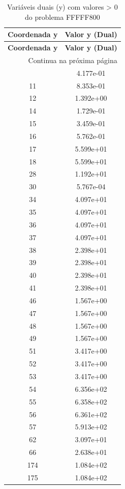 \documentclass[12pt]{article}
\begin{document}
\begin{longtable}{@{}cc@{}}
\caption{Variáveis duais (y) com valores > 0 do problema FFFFF800} \\
\toprule
\textbf{Coordenada y} & \textbf{Valor y (Dual)} \\
\midrule
\endfirsthead

\toprule
\textbf{Coordenada y} & \textbf{Valor y (Dual)} \\
\midrule
\endhead

\midrule \multicolumn{2}{r}{{Continua na próxima página}} \\ \midrule
\endfoot

\bottomrule
\endlastfoot
10 & 4.177e-01 \\
11 & 8.353e-01 \\
12 & 1.392e+00 \\
14 & 1.729e-01 \\
15 & 3.459e-01 \\
16 & 5.762e-01 \\
17 & 5.599e+01 \\
18 & 5.599e+01 \\
28 & 1.192e+01 \\
30 & 5.767e-04 \\
34 & 4.097e+01 \\
35 & 4.097e+01 \\
36 & 4.097e+01 \\
37 & 4.097e+01 \\
38 & 2.398e+01 \\
39 & 2.398e+01 \\
40 & 2.398e+01 \\
41 & 2.398e+01 \\
46 & 1.567e+00 \\
47 & 1.567e+00 \\
48 & 1.567e+00 \\
49 & 1.567e+00 \\
51 & 3.417e+00 \\
52 & 3.417e+00 \\
53 & 3.417e+00 \\
54 & 6.356e+02 \\
55 & 6.358e+02 \\
56 & 6.361e+02 \\
57 & 5.913e+02 \\
62 & 3.097e+01 \\
66 & 2.638e+01 \\
174 & 1.084e+02 \\
175 & 1.084e+02 \\

\end{longtable}
\end{document}
